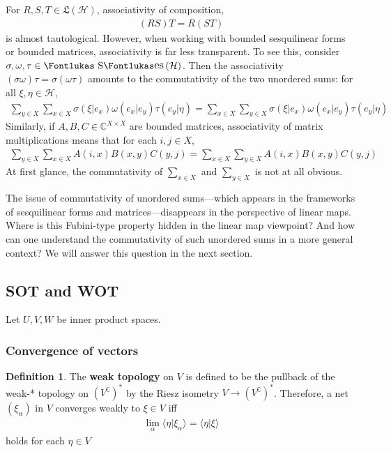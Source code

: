 \documentclass[12pt,b5paper,notitlepage]{article}
\theoremstyle{definition}
\newtheorem{df}{Definition}[subsection]
\theoremstyle{plain}
\DeclareMathOperator{\Ses}{\text{\Fontlukas S}\text{\kern -0pt {\Fontlukas\large es}}\,}
\newcommand{\fk}{\mathfrak}
\newcommand{\bk}[1]{\langle {#1}\rangle}
\newcommand{\Co}{\complement}
\newcommand{\Cbb}{\mathbb C}
\newcommand{\MH}{\mathcal H}
\numberwithin{equation}{section}
\begin{document}
For $R,S,T\in\fk L(\MH)$, associativity of composition,
\begin{align*}
(RS)T=R(ST)
\end{align*}
is almost tautological. However, when working with bounded sesquilinear forms or bounded matrices, associativity is far less transparent. To see this, consider $\sigma,\omega,\tau\in\Ses(\MH)$. Then the associativity $(\sigma\omega)\tau=\sigma(\omega\tau)$ amounts to the commutativity of the two unordered sums: for all $\xi,\eta\in\MH$,
\begin{align}\label{eq78}
\sum_{y\in X}\sum_{x\in X} \sigma(\xi|e_x)\omega(e_x|e_y)\tau(e_y|\eta)=\sum_{x\in X}\sum_{y\in X}\sigma(\xi|e_x)\omega(e_x|e_y)\tau(e_y|\eta)
\end{align}
Similarly, if $A,B,C\in\Cbb^{X\times X}$ are bounded matrices, associativity of matrix multiplications means that for each $i,j\in X$, 
\begin{align}\label{eq144}
\sum_{y\in X}\sum_{x\in X} A(i,x)B(x,y)C(y,j)=\sum_{x\in X}\sum_{y\in X}A(i,x)B(x,y)C(y,j)
\end{align}
At first glance, the commutativity of $\sum_{x\in X}$ and $\sum_{y\in X}$ is not at all obvious.

The issue of commutativity of unordered sums---which appears in the frameworks of sesquilinear forms and matrices---disappears in the perspective of linear maps. Where is this Fubini-type property hidden in the linear map viewpoint? And how can one understand the commutativity of such unordered sums in a more general context? We will answer this question in the next section.









\subsection{SOT and WOT}



Let $U,V,W$ be inner product spaces.

\subsubsection{Convergence of vectors}


\begin{df}
The \textbf{weak topology} on $V$  is defined to be the pullback of the weak-* topology on $(V^\Co)^*$ by the Riesz isometry $V\rightarrow (V^\Co)^*$. Therefore, a net $(\xi_\alpha)$ in $V$ converges weakly to $\xi \in V$ iff
\begin{align}\label{eq75}
\lim_\alpha\bk{\eta|\xi_\alpha}=\bk{\eta|\xi}
\end{align}
holds for each $\eta\in V$
\end{df}
\end{document}
